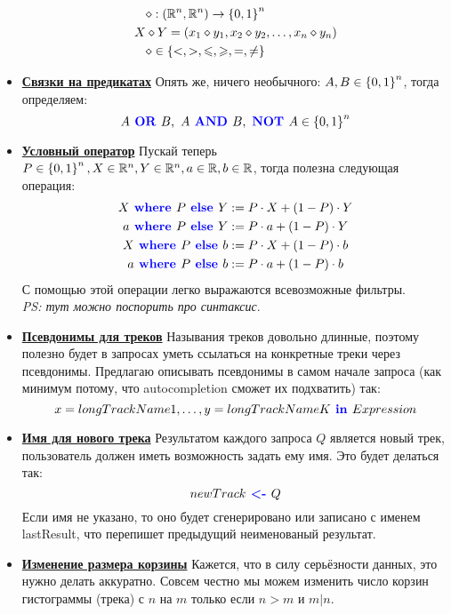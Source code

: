 \begin{itemize}
	\begin{align*}
		&\diamond: \left( \mathbb{R}^n, \mathbb{R}^n \right) \rightarrow \left\lbrace 0, 1 \right\rbrace^n \\
		X &\diamond Y = \left( x_1 \diamond y_1, x_2 \diamond y_2, \ldots, x_n \diamond y_n \right)\\
		&\diamond \in \left\lbrace  <, >, \leqslant, \geqslant, =, \neq  \right\rbrace
	\end{align*}
	\item \textbf{\underline{Связки на предикатах}} Опять же, ничего необычного: $A, B \in \left\lbrace 0, 1 \right\rbrace^n$, тогда определяем:
	\[
		A \text{\textbf{\color{blue}{ OR }}} B,\ A \text{\textbf{\color{blue}{ AND }}} B,\ \text{\textbf{\color{blue}{NOT }}} A \in  \left\lbrace 0, 1 \right\rbrace^n
	\]
	\item \textbf{\underline{Условный оператор}} Пускай теперь $P \in \left\lbrace 0, 1 \right\rbrace^n, X \in \mathbb{R}^n, Y \in \mathbb{R}^n, a \in \mathbb{R}, b \in \mathbb{R}$, тогда полезна следующая операция:
	\begin{align*}
		X \text{\textbf{\color{blue}{ where }}} P \text{\textbf{\color{blue}{ else }}} Y &:= P \cdot X + (1 - P) \cdot Y \\
		a \text{\textbf{\color{blue}{ where }}} P \text{\textbf{\color{blue}{ else }}} Y &:= P \cdot a + (1 - P) \cdot Y \\
		X \text{\textbf{\color{blue}{ where }}} P \text{\textbf{\color{blue}{ else }}} b &:= P \cdot X + (1 - P) \cdot b \\
		a \text{\textbf{\color{blue}{ where }}} P \text{\textbf{\color{blue}{ else }}} b &:= P \cdot a + (1 - P) \cdot b
	\end{align*}
	С помощью этой операции легко выражаются всевозможные фильтры.
	\\\emph{PS: тут можно поспорить про синтаксис}.
	\item \textbf{\underline{Псевдонимы для треков}} Называния треков довольно длинные, поэтому полезно будет в запросах уметь ссылаться на конкретные треки через псевдонимы. Предлагаю описывать псевдонимы в самом начале запроса (как минимум потому, что autocompletion сможет их подхватить) так:
	\[
		x = longTrackName1, \ldots, y = longTrackNameK \text{\textbf{\color{blue}{ in }}} Expression
	\]
	\item \textbf{\underline{Имя для нового трека}} Результатом каждого запроса $Q$ является новый трек, пользователь должен иметь возможность задать ему имя. Это будет делаться так:
	\[
		newTrack \text{\textbf{\color{blue}{ <- }}} Q
	\]
	Если имя не указано, то оно будет сгенерировано или записано с именем lastResult, что перепишет предыдущий неименованый результат.

	\item \textbf{\underline{Изменение размера корзины}} Кажется, что в силу серьёзности данных, это нужно делать аккуратно. Совсем честно мы можем изменить число корзин гистограммы (трека) с $n$ на $m$ только если $n > m$ и $m | n$.
\end{itemize}

